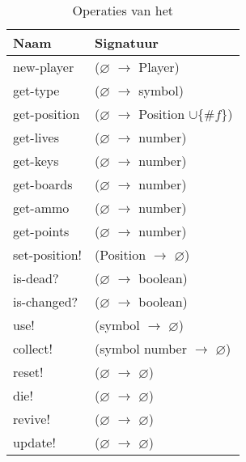 \begin{table}[hbt]
\centering
\begin{tabular}{|ll|}
\hline
\rowcolor[HTML]{000000} 
{\color[HTML]{FFFFFF} \textbf{Naam}} & {\color[HTML]{FFFFFF} \textbf{Signatuur}} \\ \hline
new-player    & ($\varnothing$ $\rightarrow$ Player) \\ \hline
get-type      & ($\varnothing$ $\rightarrow$ symbol)                        \\ \hline
get-position  & ($\varnothing$ $\rightarrow$ Position $\cup\{\#f\}$)                        \\ \hline
get-lives      & ($\varnothing$ $\rightarrow$ number)                        \\ \hline
get-keys      & ($\varnothing$ $\rightarrow$ number)                        \\ \hline
get-boards      & ($\varnothing$ $\rightarrow$ number)                        \\ \hline
get-ammo      & ($\varnothing$ $\rightarrow$ number)                        \\ \hline
get-points      & ($\varnothing$ $\rightarrow$ number)                        \\ \hline
set-position! & (Position $\rightarrow$ $\varnothing$)                        \\ \hline
is-dead?      & ($\varnothing$ $\rightarrow$ boolean)               \\ \hline
is-changed?      & ($\varnothing$ $\rightarrow$ boolean)               \\ \hline
use!          & (symbol $\rightarrow$ $\varnothing$)                   \\ \hline
collect!          & (symbol number $\rightarrow$ $\varnothing$)                   \\ \hline
reset!          & ($\varnothing$ $\rightarrow$ $\varnothing$)                   \\ \hline
die!          & ($\varnothing$ $\rightarrow$ $\varnothing$)                   \\ \hline
revive!       & ($\varnothing$ $\rightarrow$ $\varnothing$)                   \\ \hline
update!       & ($\varnothing$ $\rightarrow$ $\varnothing$)                   \\ \hline
\end{tabular}
\caption{Operaties van het \texttt{}}
\label{table:ant}
\end{table}


